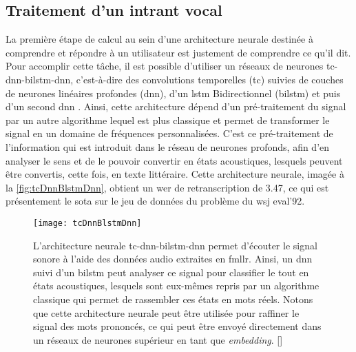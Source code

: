 \subsection{Traitement d'un intrant vocal}
La première étape de calcul au sein d’une architecture neurale destinée à comprendre et répondre à un utilisateur est justement de comprendre ce qu’il dit. Pour accomplir cette tâche, il est possible d’utiliser un réseaux de neurones \gls{tc}-\gls{dnn}-\gls{bilstm}-\gls{dnn}, c’est-à-dire des convolutions temporelles (\gls{tc}) suivies de couches de neurones linéaires profondes (\gls{dnn}), d’un \gls{lstm} Bidirectionnel (\gls{bilstm}) et puis d’un second \gls{dnn} \cite{acousticModeling}. Ainsi, cette architecture dépend d’un pré-traitement du signal par un autre algorithme lequel est plus classique et permet de transformer le signal en un domaine de fréquences personnalisées. C’est ce pré-traitement de l’information qui est introduit dans le réseau de neurones profonds, afin d’en analyser le sens et de le pouvoir convertir en états acoustiques, lesquels peuvent être convertis, cette fois, en texte littéraire. Cette architecture neurale, imagée à la \autoref{fig:tcDnnBlstmDnn}, obtient un \gls{wer} de retranscription de 3.47, ce qui est présentement le \gls{sota} sur le jeu de données du problème du \gls{wsj} eval’92.

\begin{figure*}
  \centering
  \texttt{[image: tcDnnBlstmDnn]}
  \caption{L’architecture neurale \gls{tc}-\gls{dnn}-\gls{bilstm}-\gls{dnn} permet d’écouter le signal sonore à l’aide des données audio extraites en \gls{fmllr}. Ainsi, un \gls{dnn} suivi d’un \gls{bilstm} peut analyser ce signal pour classifier le tout en états acoustiques, lesquels sont eux-mêmes repris par un algorithme classique qui permet de rassembler ces états en mots réels. Notons que cette architecture neurale peut être utilisée pour raffiner le signal des mots prononcés, ce qui peut être envoyé directement dans un réseaux de neurones supérieur en tant que \textit{embedding}. []}
  \label{fig:tcDnnBlstmDnn}
\end{figure*}

